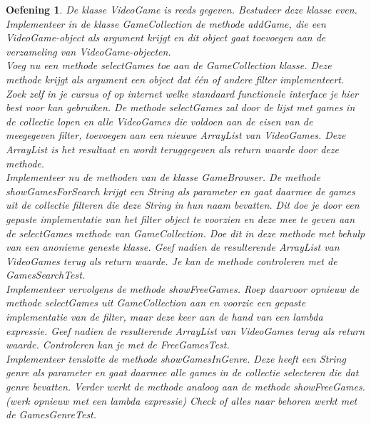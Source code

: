 \documentclass{tstextbook}
\newtheorem{envoefening}{Oefening}[chapter]
\newenvironment{oefening}
               {\begin{boxexercise}\begin{envoefening}}
               {\end{envoefening}\end{boxexercise}}
\begin{document}
\begin{oefening}
De klasse \textit{VideoGame} is reeds gegeven. Bestudeer deze klasse even. \\

Implementeer in de klasse \textit{GameCollection} de methode \textit{addGame}, die een VideoGame-object als argument krijgt en dit object gaat
toevoegen aan de verzameling van VideoGame-objecten.\\

Voeg nu een methode \textit{selectGames} toe aan de GameCollection klasse. Deze methode krijgt als
argument een object dat één of andere filter implementeert. Zoek zelf in je cursus of op internet welke
standaard functionele interface je hier best voor kan gebruiken. De methode selectGames zal door de
lijst met games in de collectie lopen en alle VideoGames die voldoen aan de eisen van de meegegeven
filter, toevoegen aan een nieuwe ArrayList van VideoGames. Deze ArrayList is het resultaat en wordt
teruggegeven als return waarde door deze methode.\\

Implementeer nu de methoden van de klasse \textit{GameBrowser}. 
De methode showGamesForSearch krijgt een String  als
parameter en gaat daarmee de games uit de collectie filteren die deze String in hun naam bevatten. Dit
doe je door een gepaste implementatie van het filter object te voorzien en deze mee te geven aan de
selectGames methode van GameCollection. Doe dit in deze methode met behulp van een anonieme geneste klasse.
Geef nadien de resulterende ArrayList van VideoGames terug als return waarde.
Je kan de methode controleren met de GamesSearchTest.\\

Implementeer vervolgens de methode \textit{showFreeGames}. Roep daarvoor opnieuw de methode selectGames
uit GameCollection aan en voorzie een gepaste implementatie van de filter, maar deze keer aan de hand
van een lambda expressie. Geef nadien de resulterende ArrayList van VideoGames terug als return waarde.
Controleren kan je met de FreeGamesTest.\\

Implementeer tenslotte de methode \textit{showGamesInGenre}. Deze heeft een String genre als
parameter en gaat daarmee alle games in de collectie selecteren die dat genre bevatten. Verder werkt
de methode analoog aan de methode showFreeGames. (werk opnieuw met een lambda expressie)
Check of alles naar behoren werkt met de GamesGenreTest.
\end{oefening}
\end{document}
